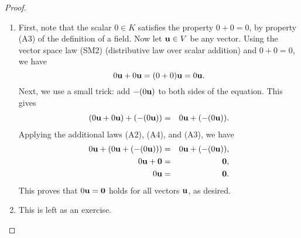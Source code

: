 \begin{proof}
\begin{enumialphparenastyle}
\begin{enumerate}
    \item First, note that the scalar $0\in K$ satisfies the property
      $0+0=0$, by property (A3) of the definition of a field. Now let
      $\vect{u}\in V$ be any vector. Using the vector space law (SM2)
      (distributive law over scalar addition) and $0+0=0$, we have
      \begin{equation*}
        0\vect{u}+0\vect{u} = (0+0) \vect{u} = 0\vect{u}.
      \end{equation*}
      Next, we use a small trick: add $-(0\vect{u})$ to both sides of
      the equation. This gives
      \begin{eqnarray*}
        (0\vect{u}+0\vect{u})+(-(0\vect{u})) &=& 0\vect{u} + (-(0\vect{u})).
      \end{eqnarray*}
      Applying the additional laws (A2), (A4), and (A3), we have
      \begin{eqnarray*}
        0\vect{u}+(0\vect{u}+(-(0\vect{u}))) &=& 0\vect{u} + (-(0\vect{u})), \\
        0\vect{u} + \vect{0} &=& \vect{0}, \\
        0\vect{u} &=& \vect{0}.
      \end{eqnarray*}
      This proves that $0\vect{u} = \vect{0}$ holds for all vectors
      $\vect{u}$, as desired.

    \item This is left as an exercise.
    \end{enumerate}
  \end{enumialphparenastyle}
\end{proof}

